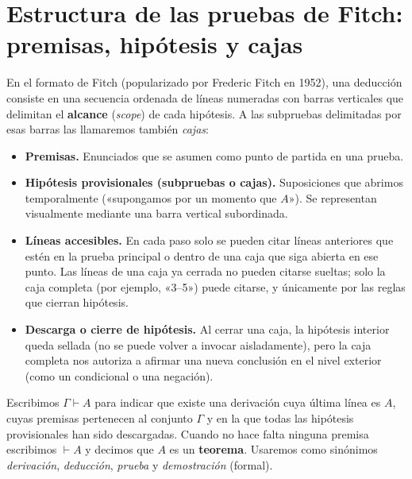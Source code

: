 
\section{Estructura de las pruebas de Fitch: premisas, hipótesis y cajas}

En el formato de Fitch (popularizado por Frederic Fitch en 1952), una deducción consiste en una secuencia ordenada de líneas numeradas con barras verticales que delimitan el \textbf{alcance} (\emph{scope}) de cada hipótesis. A las subpruebas delimitadas por esas barras las llamaremos también \emph{cajas}:

\begin{itemize}
    \item \textbf{Premisas.} Enunciados que se asumen como punto de
      partida en una prueba.
    \item \textbf{Hipótesis provisionales (subpruebas o cajas).} Suposiciones que abrimos temporalmente («supongamos por un momento que $A$»). Se representan visualmente mediante una barra vertical subordinada.
    \item \textbf{Líneas accesibles.} En cada paso solo se pueden citar líneas anteriores que estén en la prueba principal o dentro de una caja que siga abierta en ese punto. Las líneas de una caja ya cerrada no pueden citarse sueltas; solo la caja completa (por ejemplo, «3--5») puede citarse, y únicamente por las reglas que cierran hipótesis.
    \item \textbf{Descarga o cierre de hipótesis.} Al cerrar una caja, la hipótesis interior queda sellada (no se puede volver a invocar aisladamente), pero la caja completa nos autoriza a afirmar una nueva conclusión en el nivel exterior (como un condicional o una negación).
\end{itemize}

Escribimos $\Gamma \vdash A$ para indicar que existe una derivación cuya última línea es $A$, cuyas premisas pertenecen al conjunto $\Gamma$ y en la que todas las hipótesis provisionales han sido descargadas. Cuando no hace falta ninguna premisa escribimos $\vdash A$ y decimos que $A$ es un \textbf{teorema}. Usaremos como sinónimos \emph{derivación}, \emph{deducción}, \emph{prueba} y \emph{demostración} (formal).

